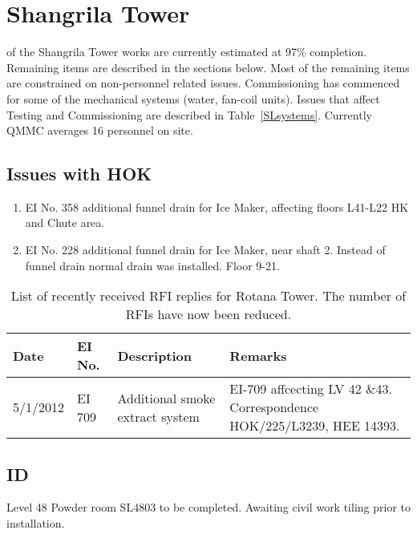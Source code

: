 \chapter{Shangrila Tower}

 of the Shangrila Tower works are currently estimated at 97\% completion. Remaining items are described in the sections below.  Most of the remaining items  are constrained on non-personnel related issues. Commissioning has commenced for some of the mechanical systems (water, fan-coil units). Issues that affect Testing and Commissioning are described in Table~\ref{SLsystems}. Currently QMMC averages 16 personnel on site. 

\section{Issues with HOK}

\begin{enumerate}
\item EI No. 358 additional funnel drain for Ice Maker, affecting floors L41-L22 HK and Chute area.
\item EI No. 228 additional funnel drain for Ice Maker, near shaft 2. Instead of funnel drain normal drain was installed. Floor 9-21.
\end{enumerate}


\begin{table}[htbp]
\small\RaggedRight
\begin{tabular}{@{}llp{3cm}p{3cm}}
\toprule
Date &EI No. &Description &Remarks\\
\midrule
5/1/2012 &EI 709  &Additional smoke extract system &EI-709 affcecting LV 42 \&43. Correspondence HOK/225/L3239, HEE 14393.\\
\bottomrule
\end{tabular}
\caption{List of recently received RFI replies for Rotana Tower. The number of RFIs have now been reduced.}
\end{table}
\section{ID}
Level 48 Powder room SL4803 to be completed. Awaiting civil work tiling prior to installation.

